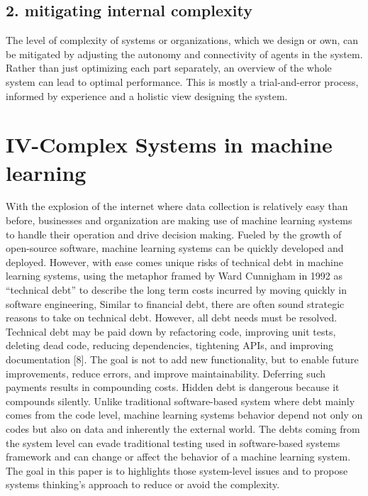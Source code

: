 \documentclass[]{article}
\begin{document}
\subsection{2. mitigating internal
complexity}\label{mitigating-internal-complexity}

The level of complexity of systems or organizations, which we design or
own, can be mitigated by adjusting the autonomy and connectivity of
agents in the system. Rather than just optimizing each part separately,
an overview of the whole system can lead to optimal performance. This is
mostly a trial-and-error process, informed by experience and a holistic
view designing the system.

\section{IV-Complex Systems in machine
learning}\label{iv-complex-systems-in-machine-learning}

With the explosion of the internet where data collection is relatively
easy than before, businesses and organization are making use of machine
learning systems to handle their operation and drive decision making.
Fueled by the growth of open-source software, machine learning systems
can be quickly developed and deployed. However, with ease comes unique
risks of technical debt in machine learning systems, using the metaphor
framed by Ward Cunnigham in 1992 as ``technical debt'' to describe the
long term costs incurred by moving quickly in software engineering,
Similar to financial debt, there are often sound strategic reasons to
take on technical debt. However, all debt needs must be resolved.
Technical debt may be paid down by refactoring code, improving unit
tests, deleting dead code, reducing dependencies, tightening APIs, and
improving documentation {[}8{]}. The goal is not to add new
functionality, but to enable future improvements, reduce errors, and
improve maintainability. Deferring such payments results in compounding
costs. Hidden debt is dangerous because it compounds silently. Unlike
traditional software-based system where debt mainly comes from the code
level, machine learning systems behavior depend not only on codes but
also on data and inherently the external world. The debts coming from
the system level can evade traditional testing used in software-based
systems framework and can change or affect the behavior of a machine
learning system. The goal in this paper is to highlights those
system-level issues and to propose systems thinking's approach to reduce
or avoid the complexity.
\end{document}
